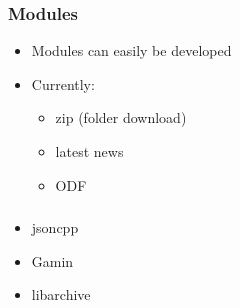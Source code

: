 \documentclass[]{beamer}
\begin{document}
\begin{frame}
\frametitle{Modules}
\begin{itemize}
  \item Modules can easily be developed
  \item Currently:
    \begin{itemize}
      \item zip (folder download)
      \item latest news
      \item ODF
    \end{itemize}
\end{itemize}
\end{frame}

\begin{frame}
\frametitle{}
\begin{itemize}
  \item jsoncpp
  \item Gamin
  \item libarchive
\end{itemize}
\end{frame}
\end{document}
